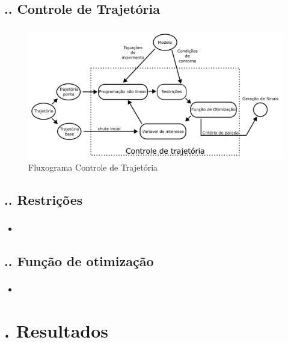 \documentclass[aspectratio=169]{beamer}
\begin{document}
\subsection{\insertsectionnumber .\insertsubsectionnumber . Controle de Trajetória}
\begin{frame}
  \frametitle{\insertsubsection}
  \begin{figure}[H]
    \centering
    \caption{Fluxograma Controle de Trajetória}
    \includegraphics[scale=0.5]{controle_de_trajetoria}

    \label{fig:controle_de_trajetoria}
  \end{figure}
\end{frame}

\subsection{\insertsectionnumber .\insertsubsectionnumber . Restrições}
\begin{frame}
  \frametitle{\insertsubsection}
  \begin{itemize}
    \item 
  \end{itemize}
\end{frame}

\subsection{\insertsectionnumber .\insertsubsectionnumber . Função de otimização}
\begin{frame}
  \frametitle{\insertsubsection}
  \begin{itemize}
    \item 
  \end{itemize}
\end{frame}

\section{\insertsectionnumber . Resultados}
\end{document}
